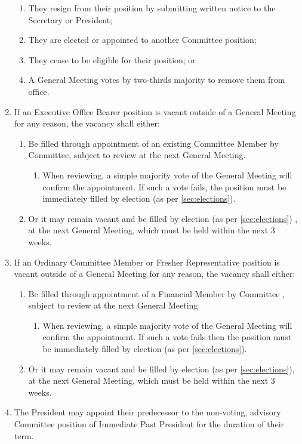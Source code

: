 \documentclass[a4paper]{article}
\begin{document}
\begin{enumerate}
\begin{enumerate}
            \item They resign from their position by submitting written notice to the Secretary or President;
            \item They are elected or appointed to another Committee position; 
            \item They cease to be eligible for their position; or
            \item A General Meeting votes by two-thirds majority  to remove them from office.
        \end{enumerate}
    \item \label{item:exec_vacancy} If an Executive Office Bearer position is vacant outside of a General Meeting for any reason, the vacancy shall either:
        \begin{enumerate}
            \item Be filled through appointment of an existing Committee Member by Committee, subject to review at the next General Meeting.
                \begin{enumerate}
                    \item When reviewing, a simple majority vote of the General Meeting will confirm the appointment. If such a vote fails, the position must be immediately filled by election (as per \cref{sec:elections}).
                \end{enumerate}
            \item Or it may remain vacant and be filled by election (as per \cref{sec:elections}) , at the next General Meeting, which must be held within the next 3 weeks.
        \end{enumerate}
    \item \label{item:ocm_vacancy} If an Ordinary Committee Member or Fresher Representative position is vacant outside of a General Meeting for any reason, the vacancy shall either:
        \begin{enumerate}
            \item Be filled through appointment of a Financial Member by Committee , subject to review at the next General Meeting
                \begin{enumerate}
                    \item When reviewing, a simple majority vote of the General Meeting will confirm the appointment. If such a vote fails then the position must be immediately filled by election (as per \cref{sec:elections}).
                \end{enumerate}
            \item Or it may remain vacant and be filled by election (as per \cref{sec:elections}), at the next General Meeting, which must be held within the next 3 weeks.
        \end{enumerate}
    \item The President may appoint their predecessor to the non-voting, advisory Committee position of Immediate Past President for the duration of their term.
\end{enumerate}
\end{document}
